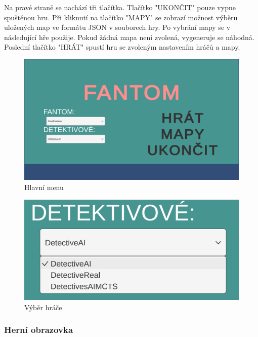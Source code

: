 Na pravé straně se nachází tři tlačítka. Tlačítko "UKONČIT" pouze vypne spuštěnou hru. Při kliknutí na tlačítko "MAPY" se zobrazí možnost výběru uložených map ve formátu JSON v souborech hry. Po vybrání mapy se v následující hře použije. Pokud žádná mapa není zvolená, vygeneruje se náhodná. Poslední tlačítko "HRÁT" spustí hru se zvoleným nastavením hráčů a mapy.

\begin{figure}[h] %
  \centering
  \includegraphics[width=1\textwidth]{main_menu.png}
  \caption{Hlavní menu}
  \label{fig:main_menu}
\end{figure}

\begin{figure}[h]
  \centering
  \includegraphics[width=1\textwidth]{player_selector.png}
  \caption{Výběr hráče}
  \label{fig:player_selector}
\end{figure}
\clearpage
\subsubsection{Herní obrazovka}

